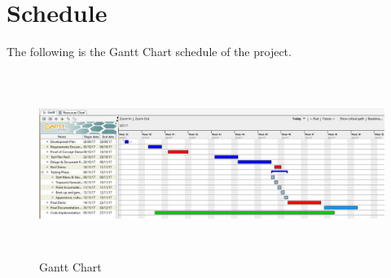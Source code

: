 \documentclass[12pt, titlepage]{article}
\begin{document}
\newpage
\section{Schedule}
\noindent The following is the Gantt Chart schedule of the project.
\begin{figure}[h!]
\centering
\includegraphics[width = 14cm, height = 6cm]{GanttChart}
\caption{Gantt Chart}
\end{figure}
\end{document}
